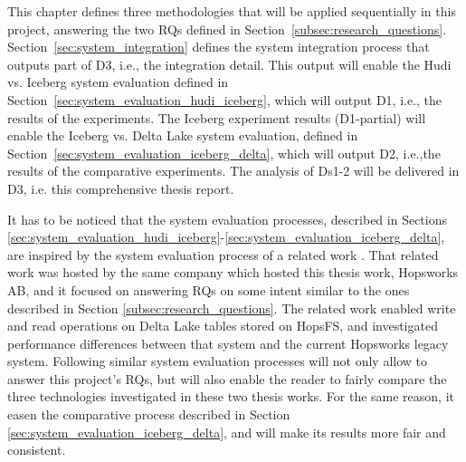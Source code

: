 This chapter defines three methodologies that will be applied sequentially in this project, answering the two \glspl{RQ} defined in Section~\ref{subsec:research_questions}. Section~\ref{sec:system_integration} defines the system integration process that outputs part of \gls{D}3, i.e., the integration detail. This output will enable the Hudi vs. Iceberg system evaluation defined in Section~\ref{sec:system_evaluation_hudi_iceberg}, which will output \gls{D}1, i.e., the results of the experiments. The Iceberg experiment results (\gls{D}1-partial) will enable the Iceberg vs. Delta Lake system evaluation, defined in Section~\ref{sec:system_evaluation_iceberg_delta}, which will output \gls{D}2, i.e.,the results of the comparative experiments. The analysis of \glspl{D}1-2 will be delivered in \gls{D}3, i.e. this comprehensive thesis report.

It has to be noticed that the system evaluation processes, described in Sections \ref{sec:system_evaluation_hudi_iceberg}-\ref{sec:system_evaluation_iceberg_delta}, are inspired by the system evaluation process of a related work \cite{manfrediReducingReadWrite2024}. That related work was hosted by the same company which hosted this thesis work, Hopsworks AB, and it focused on answering \glspl{RQ} on some intent similar to the ones described in Section \ref{subsec:research_questions}. The related work enabled write and read operations on Delta Lake tables stored on \gls{HopsFS}, and investigated performance differences between that system and the current Hopsworks legacy system. Following similar system evaluation processes will not only allow to answer this project's \glspl{RQ}, but will also enable the reader to fairly compare the three technologies investigated in these two thesis works. For the same reason, it easen the comparative process described in Section \ref{sec:system_evaluation_iceberg_delta}, and will make its results more fair and consistent.